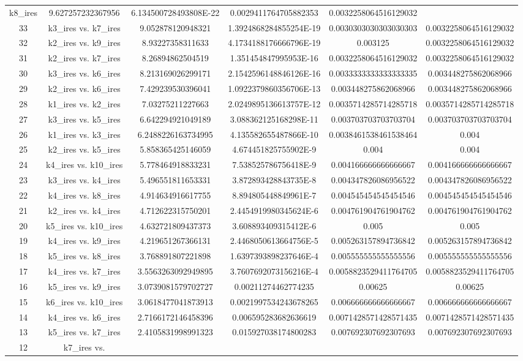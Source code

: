 \documentclass[a4paper,10pt]{article}
\begin{document}
\begin{landscape}
\begin{table}[!htp]
\begin{tabular}{cccccc}
k8_ires&9.627257232367956&6.134500728493808E-22&0.0029411764705882353&0.0032258064516129032\\33&k3_ires vs. k7_ires&9.052878120948321&1.3924868284855254E-19&0.0030303030303030303&0.0032258064516129032\\32&k2_ires vs. k9_ires&8.93227358311633&4.1734188176666796E-19&0.003125&0.0032258064516129032\\31&k2_ires vs. k7_ires&8.26894862504519&1.351454847995953E-16&0.0032258064516129032&0.0032258064516129032\\30&k3_ires vs. k6_ires&8.213169026299171&2.1542596148846126E-16&0.0033333333333333335&0.003448275862068966\\29&k2_ires vs. k6_ires&7.429239530396041&1.0922379860356706E-13&0.003448275862068966&0.003448275862068966\\28&k1_ires vs. k2_ires&7.03275211227663&2.0249895136613757E-12&0.0035714285714285718&0.0035714285714285718\\27&k3_ires vs. k5_ires&6.642294921049189&3.088362125168298E-11&0.003703703703703704&0.003703703703703704\\26&k1_ires vs. k3_ires&6.2488226163734995&4.135582655487866E-10&0.0038461538461538464&0.004\\25&k2_ires vs. k5_ires&5.858365425146059&4.674451825755902E-9&0.004&0.004\\24&k4_ires vs. k10_ires&5.778464918833231&7.538525786756418E-9&0.004166666666666667&0.004166666666666667\\23&k3_ires vs. k4_ires&5.496551811653331&3.872893428843735E-8&0.004347826086956522&0.004347826086956522\\22&k4_ires vs. k8_ires&4.914634916617755&8.894805448849961E-7&0.004545454545454546&0.004545454545454546\\21&k2_ires vs. k4_ires&4.712622315750201&2.4454919980345624E-6&0.004761904761904762&0.004761904761904762\\20&k5_ires vs. k10_ires&4.632721809437373&3.608893409315412E-6&0.005&0.005\\19&k4_ires vs. k9_ires&4.219651267366131&2.4468050613664756E-5&0.005263157894736842&0.005263157894736842\\18&k5_ires vs. k8_ires&3.768891807221898&1.6397393898237646E-4&0.005555555555555556&0.005555555555555556\\17&k4_ires vs. k7_ires&3.5563263092949895&3.7607692073156216E-4&0.0058823529411764705&0.0058823529411764705\\16&k5_ires vs. k9_ires&3.0739081579702727&0.00211274462774235&0.00625&0.00625\\15&k6_ires vs. k10_ires&3.0618477041873913&0.0021997534243678265&0.006666666666666667&0.006666666666666667\\14&k4_ires vs. k6_ires&2.7166172146458396&0.006595283682636619&0.0071428571428571435&0.0071428571428571435\\13&k5_ires vs. k7_ires&2.4105831998991323&0.015927038174800283&0.007692307692307693&0.007692307692307693\\12&k7_ires vs. 
\end{tabular}
\end{table}
\end{landscape}
\end{document}

